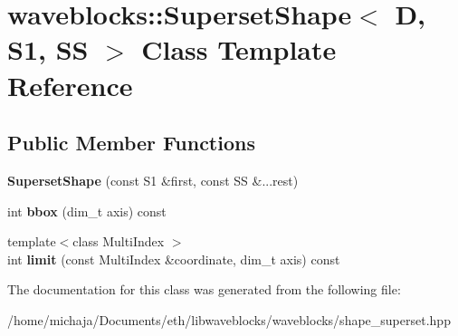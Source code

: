 \hypertarget{classwaveblocks_1_1_superset_shape}{}\section{waveblocks\+:\+:Superset\+Shape$<$ D, S1, S\+S $>$ Class Template Reference}
\label{classwaveblocks_1_1_superset_shape}
\subsection*{Public Member Functions}
\begin{DoxyCompactItemize}
\item 
\hypertarget{classwaveblocks_1_1_superset_shape_ad882eac926c92c406fc6ebee586d113e}{}{\bfseries Superset\+Shape} (const S1 \&first, const S\+S \&...rest)\label{classwaveblocks_1_1_superset_shape_ad882eac926c92c406fc6ebee586d113e}

\item 
\hypertarget{classwaveblocks_1_1_superset_shape_a12dfa99ac121382a2529a29af836235b}{}int {\bfseries bbox} (dim\+\_\+t axis) const \label{classwaveblocks_1_1_superset_shape_a12dfa99ac121382a2529a29af836235b}

\item 
\hypertarget{classwaveblocks_1_1_superset_shape_adbc0e0c15fb15dbbed7706b46720861b}{}{\footnotesize template$<$class Multi\+Index $>$ }\\int {\bfseries limit} (const Multi\+Index \&coordinate, dim\+\_\+t axis) const \label{classwaveblocks_1_1_superset_shape_adbc0e0c15fb15dbbed7706b46720861b}

\end{DoxyCompactItemize}


The documentation for this class was generated from the following file\+:\begin{DoxyCompactItemize}
\item 
/home/michaja/\+Documents/eth/libwaveblocks/waveblocks/shape\+\_\+superset.\+hpp\end{DoxyCompactItemize}

